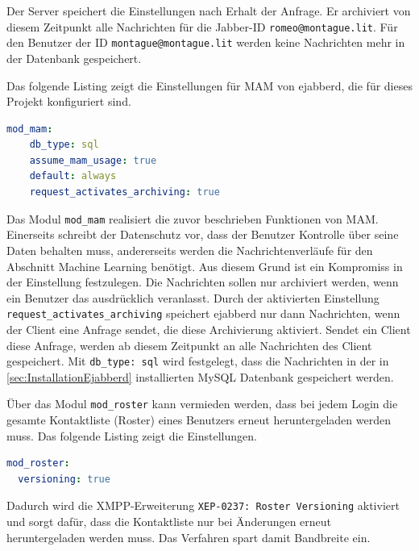 \documentclass[a4paper,titlepage,halfparskip,12pt]{scrreprt}
\begin{document}
\begin{onehalfspacing}
Der Server speichert die Einstellungen nach Erhalt der Anfrage. Er archiviert von diesem Zeitpunkt alle Nachrichten für die Jabber-ID \texttt{romeo@montague.lit}. Für den Benutzer der ID \texttt{montague@montague.lit} werden keine Nachrichten mehr in der Datenbank gespeichert.

Das folgende Listing zeigt die Einstellungen für \ac{MAM} von ejabberd, die für dieses Projekt konfiguriert sind.

\bigskip

\begin{lstlisting}[language=yaml, caption={Konfiguration der Einstellungen für die Nachrichtenarchivierung}]
mod_mam:
    db_type: sql
    assume_mam_usage: true
    default: always
    request_activates_archiving: true
\end{lstlisting}

Das Modul \texttt{mod\_mam} realisiert die zuvor beschrieben Funktionen von \ac{MAM}. Einerseits schreibt der Datenschutz vor, dass der Benutzer Kontrolle über seine Daten behalten muss, andererseits werden die Nachrichtenverläufe für den Abschnitt Machine Learning benötigt. Aus diesem Grund ist ein Kompromiss in der Einstellung festzulegen. Die Nachrichten sollen nur archiviert werden, wenn ein Benutzer das ausdrücklich veranlasst. Durch der aktivierten Einstellung \texttt{request\_activates\_archiving} speichert ejabberd nur dann Nachrichten, wenn der Client eine Anfrage sendet, die diese Archivierung aktiviert. Sendet ein Client diese Anfrage, werden ab diesem Zeitpunkt an alle Nachrichten des Client gespeichert. Mit \texttt{db\_type: sql} wird festgelegt, dass die Nachrichten in der in \autoref{sec:InstallationEjabberd} installierten MySQL Datenbank gespeichert werden.

Über das Modul \texttt{mod\_roster} kann vermieden werden, dass bei jedem Login die gesamte Kontaktliste (Roster) eines Benutzers erneut heruntergeladen werden muss. Das folgende Listing zeigt die Einstellungen.

\bigskip

\begin{lstlisting}[language=yaml, caption={Einstellungen des Moduls mod\_rosters}]
mod_roster:
  versioning: true
\end{lstlisting}

Dadurch wird die \ac{XMPP}-Erweiterung \texttt{XEP-0237: Roster Versioning} \cite{xep0237RosterVersioning} aktiviert und sorgt dafür, dass die Kontaktliste nur bei Änderungen erneut heruntergeladen werden muss. Das Verfahren spart damit Bandbreite ein.


\end{onehalfspacing}
\end{document}
